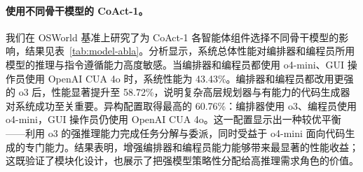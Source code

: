 \documentclass{article} %
\newcommand{\ours}{CoAct-1\xspace}
\begin{document}
\paragraph{使用不同骨干模型的 \ours。}
\begin{table}[t]
\centering
\caption{\label{tab:model-abla}\ours 中各参与智能体采用不同骨干模型时的性能。更强的编排器能够显著改善 OSWorld 上的表现。}
\renewcommand{\arraystretch}{1.2}
\end{table}
我们在 OSWorld 基准上研究了为 \ours 各智能体组件选择不同骨干模型的影响，结果见表~\ref{tab:model-abla}。分析显示，系统总体性能对编排器和编程员所用模型的推理与指令遵循能力高度敏感。当编排器和编程员都使用 o4-mini、GUI 操作员使用 OpenAI CUA 4o 时，系统性能为 43.43\%。编排器和编程员都改用更强的 o3 后，性能显著提升至 58.72\%，说明复杂高层规划器与有能力的代码生成器对系统成功至关重要。异构配置取得最高的 60.76\%：编排器使用 o3、编程员使用 o4-mini，GUI 操作员仍使用 OpenAI CUA 4o。这一配置显示出一种较优平衡——利用 o3 的强推理能力完成任务分解与委派，同时受益于 o4-mini 面向代码生成的专门能力。结果表明，增强编排器和编程员能力能够带来最显著的性能收益；这既验证了模块化设计，也展示了把强模型策略性分配给高推理需求角色的价值。
\end{document}
